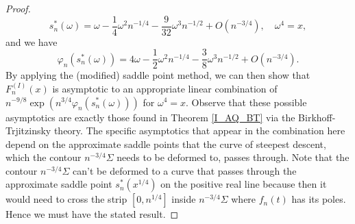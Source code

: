 \documentclass[10pt,a4paper]{amsart}
\newcommand{\p}{\varphi}
\begin{document}
\begin{proof}
    $$s^\ast_n(\omega) = \omega - \frac{1}{4} \omega^2 n^{-1/4} - \frac{9}{32} \omega^3 n^{-1/2} + O(n^{-3/4}),\quad \omega^4=x, $$
and we have
$$\p_n(s^\ast_n(\omega)) = 4\omega -\frac{1}{2} \omega^2 n^{-1/4} - \frac{3}{8} \omega^3 n^{-1/2} + O(n^{-3/4}). $$
By applying the (modified) saddle point method, we can then show that $F_n^{(I)}(x)$ is asymptotic to an appropriate linear combination of $n^{-9/8}\exp\left(n^{3/4}\p_n(s^\ast_n(\omega))\right)$ for $\omega^4=x$. Observe that these possible asymptotics are exactly those found in Theorem \ref{I_AQ_BT} via the Birkhoff-Trjitzinsky theory. The specific asymptotics that appear in the combination here depend on the approximate saddle points that the curve of steepest descent, which the contour $n^{-3/4}\Sigma$ needs to be deformed to, passes through. Note that the contour $n^{-3/4}\Sigma$ can't be deformed to a curve that passes through the approximate saddle point $s_n^\ast(x^{1/4})$ on the positive real line because then it would need to cross the strip $[0,n^{1/4}]$ inside $n^{-3/4}\Sigma$ where $f_n(t)$ has its poles. Hence we must have the stated result. 
\end{proof}
\end{document}
